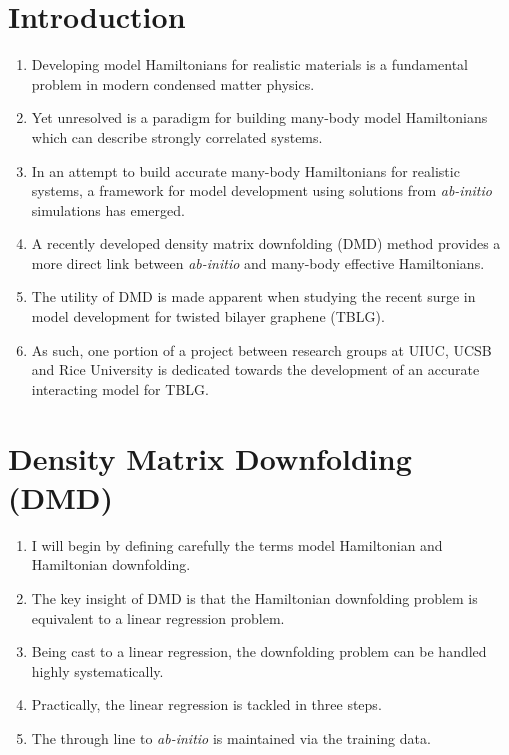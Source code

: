 \documentclass{article}
\begin{document}
\section{Introduction}
\begin{enumerate}
\item Developing model Hamiltonians for realistic materials is a fundamental problem in modern condensed matter physics.

\item Yet unresolved is a paradigm for building many-body model Hamiltonians which can describe strongly correlated systems.

\item In an attempt to build accurate many-body Hamiltonians for realistic systems, a framework for model development using solutions from \textit{ab-initio} simulations has emerged.

\item A recently developed density matrix downfolding (DMD) method provides a more direct link between \textit{ab-initio} and many-body effective Hamiltonians.

\item The utility of DMD is made apparent when studying the recent surge in model development for twisted bilayer graphene (TBLG).

\item As such, one portion of a project between research groups at UIUC, UCSB and Rice University is dedicated towards the development of an accurate interacting model for TBLG.
\end{enumerate}

\section{Density Matrix Downfolding (DMD)}
\begin{enumerate}
\item I will begin by defining carefully the terms model Hamiltonian and Hamiltonian downfolding.

\item The key insight of DMD is that the Hamiltonian downfolding problem is equivalent to a linear regression problem.

\item Being cast to a linear regression, the downfolding problem can be handled highly systematically.

\item Practically, the linear regression is tackled in three steps.

\item The through line to \textit{ab-initio} is maintained via the training data.
\end{enumerate}
\end{document}
